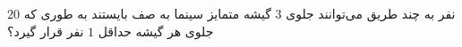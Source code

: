 \p
$20$ 
نفر به چند طریق می‌توانند جلوی
$3$
گیشه متمایز سینما به صف بایستند به طوری که جلوی هر گیشه حداقل
$1$ 
 نفر قرار گیرد؟